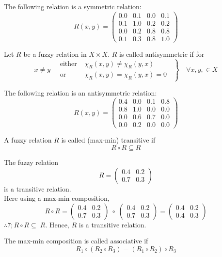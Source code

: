 \documentclass[../main-sheet.tex]{subfiles}
\begin{document}
\begin{ex}
    The following relation is a symmetric relation:
    \[R(x,y)=\begin{pmatrix}
        0.0 & 0.1 & 0.0 & 0.1 \\
        0.1 & 1.0 & 0.2 & 0.2 \\
        0.0 & 0.2 & 0.8 & 0.8 \\
        0.1 & 0.3 & 0.8 & 1.0
    \end{pmatrix}\]
\end{ex}
\begin{defn}[Antisymmetic]
    Let \(R \)  be a fuzzy relation in \(X\times X \). \(R \) is called antisymmetric if for 
    \[x\neq y \quad\left.\begin{aligned}
        \text{either }& \chi_R(x,y)\neq \chi_R(y,x)\\
        \text{or }& \chi_R(x,y)= \chi_R(y,x)=0
    \end{aligned}\;\;\right\}\quad \forall x,y,\in X \]
\end{defn}
\begin{ex}
    The following relation is an antisymmetric relation:
    \[R(x,y)=\begin{pmatrix}
        0.4 & 0.0 & 0.1 & 0.8 \\
        0.8 & 1.0 & 0.0 & 0.0 \\
        0.0 & 0.6 & 0.7 & 0.0 \\
        0.0 & 0.2 & 0.0 & 0.0
    \end{pmatrix}\]
\end{ex}
\begin{defn}
    A fuzzy relation \(R \) is called (max-min) transitive if 
    \[R\circ R\subseteq R\]
\end{defn}
\begin{ex}
    The fuzzy relation \[R=\begin{pmatrix}
        0.4 & 0.2 \\
        0.7 & 0.3
    \end{pmatrix}\] is a transitive relation.\\
    Here using a max-min composition,
    \[
        R\circ R=\begin{pmatrix}
            0.4 & 0.2 \\
            0.7 & 0.3
        \end{pmatrix}\;\circ\;\begin{pmatrix}
            0.4 & 0.2 \\
            0.7 & 0.3
        \end{pmatrix}=\begin{pmatrix}
            0.4 & 0.2 \\
            0.4 & 0.3
        \end{pmatrix}
    \]
    \(\therefore 7;R\circ R\subseteq\;R \). Hence, \(R \) is a transitive relation.
\end{ex}
\begin{defn}
    The max-min composition is called associative if 
    \[R_1\circ (R_2\circ R_3)=(R_1\circ R_2)\circ R_3\]
\end{defn}
\end{document}
